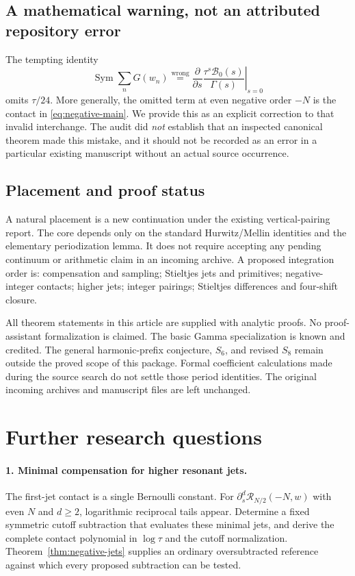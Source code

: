 \documentclass[11pt,a4paper]{article}
\numberwithin{equation}{section}
\theoremstyle{definition}
\theoremstyle{remark}
\DeclareMathOperator{\Sym}{Sym}
\newcommand{\Rcal}{\mathcal R}
\newcommand{\Bcal}{\mathcal B}
\begin{document}
\subsection{A mathematical warning, not an attributed repository error}
The tempting identity
\[
 \Sym\sum_n G(w_n)\stackrel{\mathrm{wrong}}=
     \left.\frac{\partial}{\partial s}
          \frac{\tau^s\Bcal_0(s)}{\Gamma(s)}\right|_{s=0}
\]
omits $\tau/24$. More generally, the omitted term at even negative
order $-N$ is the contact in \eqref{eq:negative-main}. We provide
this as an explicit correction to that invalid interchange. The
audit did \emph{not} establish that an inspected canonical theorem
made this mistake, and it should not be recorded as an error in a
particular existing manuscript without an actual source occurrence.

\subsection{Placement and proof status}
A natural placement is a new continuation under the existing
vertical-pairing report. The core depends only on the standard
Hurwitz/Mellin identities and the elementary periodization lemma.
It does not require accepting any pending continuum or arithmetic
claim in an incoming archive. A proposed integration order is:
compensation and sampling; Stieltjes jets and primitives;
negative-integer contacts; higher jets; integer pairings;
Stieltjes differences and four-shift closure.

All theorem statements in this article are supplied with analytic
proofs. No proof-assistant formalization is claimed. The basic Gamma
specialization is known and credited. The general harmonic-prefix
conjecture, $S_6$, and revised $S_8$ remain outside the proved scope
of this package. Formal coefficient calculations made during the
source search do not settle those period identities. The original
incoming archives and manuscript files are left unchanged.

\section{Further research questions}
\label{sec:questions}

\paragraph{1. Minimal compensation for higher resonant jets.}
The first-jet contact is a single Bernoulli constant. For
$\partial_s^d\Rcal_{N/2}(-N,w)$ with even $N$ and $d\ge2$,
logarithmic reciprocal tails appear. Determine a fixed symmetric
cutoff subtraction that evaluates these minimal jets, and derive
the complete contact polynomial in $\log\tau$ and the cutoff
normalization. Theorem~\ref{thm:negative-jets} supplies an ordinary
oversubtracted reference against which every proposed subtraction
can be tested.
\end{document}
